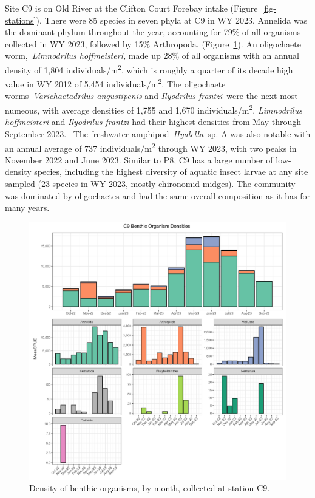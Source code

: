 \documentclass[
]{article}
\begin{document}
Site C9 is on Old River at the Clifton Court Forebay intake
(Figure~\ref{fig-stations}). There were 85 species in seven phyla at C9
in WY 2023. Annelida was the dominant phylum throughout the year,
accounting for 79\% of all organisms collected in WY 2023, followed by
15\% Arthropoda. (Figure~\ref{fig-benthic_c9}). An oligochaete
worm,~\emph{Limnodrilus hoffmeisteri,} made up 28\% of all organisms
with an annual density of 1,804 individuals/m\textsuperscript{2}, which
is roughly a quarter of its decade high value in WY 2012 of 5,454
individuals/m\textsuperscript{2}. The oligochaete
worms~\emph{Varichaetadrilus angustipenis} and \emph{Ilyodrilus
frantzi}~were the next most numeous, with average densities of 1,755 and
1,670 individuals/m\textsuperscript{2}. \emph{Limnodrilus}
\emph{hoffmeisteri} and \emph{Ilyodrilus frantzi} had their highest
densities from May through September 2023.~ The freshwater
amphipod~\emph{Hyalella}~sp. A was also notable with an annual average
of 737 individuals/m\textsuperscript{2} through WY 2023, with two peaks
in November 2022 and June 2023. Similar to P8, C9 has a large number of
low-density species, including the highest diversity of aquatic insect
larvae at any site sampled (23 species in WY 2023, mostly chironomid
midges). The community was dominated by oligochaetes and had the same
overall composition as it has for many years.

\begin{figure}

{\centering \includegraphics[width=9.84in,height=\textheight]{../figures/benthic_bar_c9.jpg}

}

\caption{\label{fig-benthic_c9}Density of benthic organisms, by month,
collected at station C9.}

\end{figure}
\end{document}
